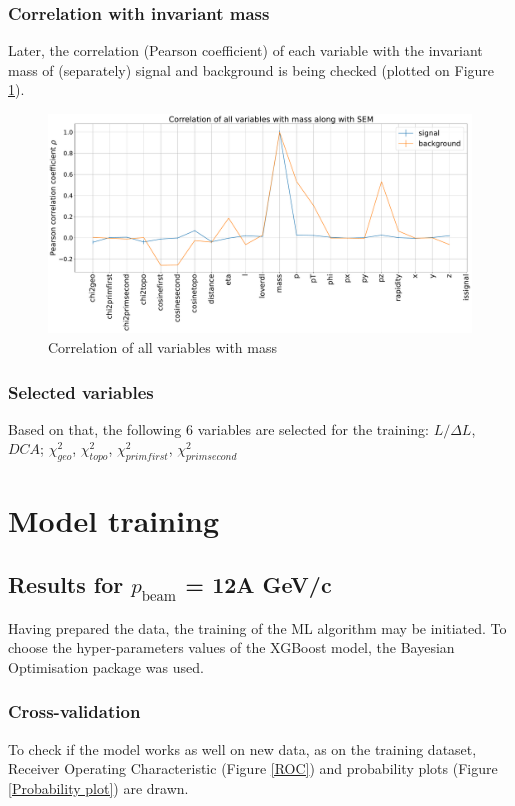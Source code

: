 \subsubsection{Correlation with invariant mass}
Later, the correlation (Pearson coefficient) of each variable with the invariant mass of (separately) signal and background is being checked (plotted on Figure \ref{all variables}).
\begin{figure}[H]
    \centering
    \includegraphics[width=1\textwidth]{img/Correlation_of_all_variables_with_mass_along_with_SEM.pdf}
    \caption{Correlation of all variables with mass}
    \label{all variables}
\end{figure}

\subsubsection{Selected variables}
Based on that, the following 6 variables are selected for the training: $L/\Delta L$, $DCA$;  $\chi^2_{geo}$, $\chi^2_{topo}$, $\chi^2_{prim first}$, $\chi^2_{prim second}$

\section{Model training}
\subsection{Results for $p_{\text{beam}}$ = 12A GeV/c}
Having prepared the data, the training of the ML algorithm may be initiated. To choose the hyper-parameters values of the XGBoost model, the Bayesian Optimisation package was used.\\
\subsubsection{Cross-validation}
To check if the model works as well on new data, as on the training dataset,  Receiver Operating Characteristic (Figure \ref{ROC}) and probability plots (Figure \ref{Probability plot}) are drawn.

